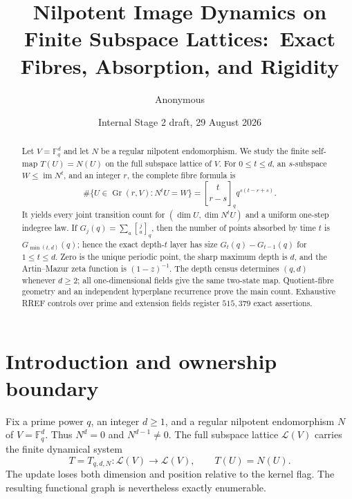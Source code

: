\documentclass[11pt,a4paper]{amsart}
\title[Nilpotent image dynamics]{Nilpotent Image Dynamics on Finite Subspace Lattices:\ Exact Fibres, Absorption, and Rigidity}
\author{Anonymous}
\date{Internal Stage 2 draft, 29 August 2026}
\newcommand{\F}{\mathbb F}
\newcommand{\Latt}{\mathcal L}
\newcommand{\Gr}{\operatorname{Gr}}
\newcommand{\im}{\operatorname{im}}
\newcommand{\qbinom}[2]{\genfrac{[}{]}{0pt}{}{#1}{#2}_{q}}
\begin{document}
\begin{abstract}
Let $V=\F_q^d$ and let $N$ be a regular nilpotent endomorphism.  We study the
finite self-map $T(U)=N(U)$ on the full subspace lattice of $V$.  For
$0\leq t\leq d$, an $s$-subspace $W\leq\im N^t$, and an integer $r$, the
complete fibre formula is
\[
 \#\{U\in\Gr(r,V):N^tU=W\}
 =\qbinom{t}{r-s}q^{s(t-r+s)}.
\]
It yields every joint transition count for $(\dim U,\dim N^tU)$ and a
uniform one-step indegree law.  If $G_j(q)=\sum_a\qbinom{j}{a}$, then the
number of points absorbed by time $t$ is $G_{\min(t,d)}(q)$; hence the exact
depth-$t$ layer has size $G_t(q)-G_{t-1}(q)$ for $1\leq t\leq d$.  Zero is
the unique periodic point, the sharp maximum depth is $d$, and the
Artin--Mazur zeta function is $(1-z)^{-1}$.  The depth census determines
$(q,d)$ whenever $d\geq2$; all one-dimensional fields give the same
two-state map.  Quotient-fibre geometry and an independent hyperplane
recurrence prove the main count.  Exhaustive RREF controls over prime and
extension fields register $515{,}379$ exact assertions.
\end{abstract}

\maketitle

\section{Introduction and ownership boundary}

Fix a prime power $q$, an integer $d\geq1$, and a regular nilpotent
endomorphism $N$ of $V=\F_q^d$.  Thus $N^d=0$ and $N^{d-1}\neq0$.  The full
subspace lattice $\Latt(V)$ carries the finite dynamical system
\begin{equation}
 \label{eq:T}
 T=T_{q,d,N}\colon\Latt(V)\longrightarrow\Latt(V),
 \qquad T(U)=N(U).
\end{equation}
The update loses both dimension and position relative to the kernel flag.
The resulting functional graph is nevertheless exactly enumerable.
\end{document}
